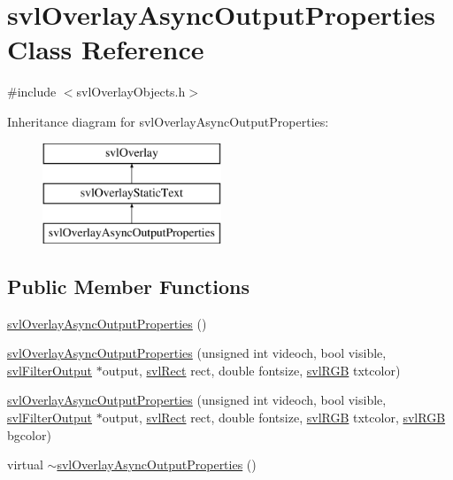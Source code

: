\hypertarget{classsvl_overlay_async_output_properties}{}\section{svl\+Overlay\+Async\+Output\+Properties Class Reference}
\label{classsvl_overlay_async_output_properties}


{\ttfamily \#include $<$svl\+Overlay\+Objects.\+h$>$}

Inheritance diagram for svl\+Overlay\+Async\+Output\+Properties\+:\begin{figure}[H]
\begin{center}
\leavevmode
\includegraphics[height=3.000000cm]{dd/dcf/classsvl_overlay_async_output_properties}
\end{center}
\end{figure}
\subsection*{Public Member Functions}
\begin{DoxyCompactItemize}
\item 
\hyperlink{classsvl_overlay_async_output_properties_a6802d3228526e7b173a8656ce5dacdc2}{svl\+Overlay\+Async\+Output\+Properties} ()
\item 
\hyperlink{classsvl_overlay_async_output_properties_ad6c842692f236608be60322d44cac8b1}{svl\+Overlay\+Async\+Output\+Properties} (unsigned int videoch, bool visible, \hyperlink{classsvl_filter_output}{svl\+Filter\+Output} $\ast$output, \hyperlink{structsvl_rect}{svl\+Rect} rect, double fontsize, \hyperlink{structsvl_r_g_b}{svl\+R\+G\+B} txtcolor)
\item 
\hyperlink{classsvl_overlay_async_output_properties_a6d215c0e5b5c0a78de38e466172a84aa}{svl\+Overlay\+Async\+Output\+Properties} (unsigned int videoch, bool visible, \hyperlink{classsvl_filter_output}{svl\+Filter\+Output} $\ast$output, \hyperlink{structsvl_rect}{svl\+Rect} rect, double fontsize, \hyperlink{structsvl_r_g_b}{svl\+R\+G\+B} txtcolor, \hyperlink{structsvl_r_g_b}{svl\+R\+G\+B} bgcolor)
\item 
virtual \hyperlink{classsvl_overlay_async_output_properties_a5fb9af890770371c121996d69b178a30}{$\sim$svl\+Overlay\+Async\+Output\+Properties} ()
\end{DoxyCompactItemize}
